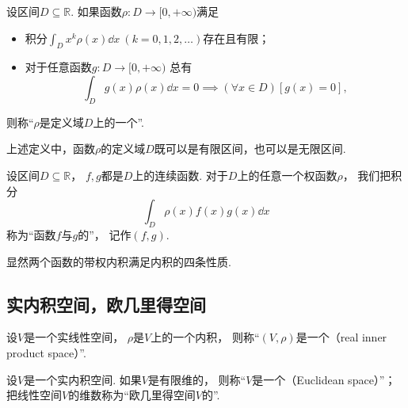\begin{definition}%
设区间\(D \subseteq \mathbb{R}\).
如果函数\(\rho\colon D \to [0,+\infty)\)满足\begin{itemize}
	\item 积分\(\int_D x^k \rho(x) \dd{x}\ (k=0,1,2,\dotsc)\)存在且有限；
	\item 对于任意函数\(g\colon D \to [0,+\infty)\)
	总有\begin{equation*}
		\int_D g(x) \rho(x) \dd{x} = 0
		\implies
		(\forall x \in D)[g(x) = 0],
	\end{equation*}
\end{itemize}
则称“\(\rho\)是定义域\(D\)上的一个”.
\end{definition}
\begin{remark}
上述定义中，函数\(\rho\)的定义域\(D\)既可以是有限区间，也可以是无限区间.
\end{remark}

\begin{definition}\label{definition:欧几里得空间.连续函数的带权内积}
设区间\(D \subseteq \mathbb{R}\)，
\(f,g\)都是\(D\)上的连续函数.
对于\(D\)上的任意一个权函数\(\rho\)，
我们把积分\begin{equation*}
	\int_D \rho(x) f(x) g(x) \dd{x}
\end{equation*}
称为“函数\(f\)与\(g\)的”，
记作\((f,g)\).
\end{definition}

显然两个函数的带权内积满足内积的四条性质.

\subsection{实内积空间，欧几里得空间}
\begin{definition}
设\(V\)是一个实线性空间，
\(\rho\)是\(V\)上的一个内积，
则称“\((V,\rho)\)是一个（real inner product space）”.
\end{definition}

\begin{definition}
设\(V\)是一个实内积空间.
如果\(V\)是有限维的，
则称“\(V\)是一个（Euclidean space）”；
把线性空间\(V\)的维数称为“欧几里得空间\(V\)的”.
\end{definition}

